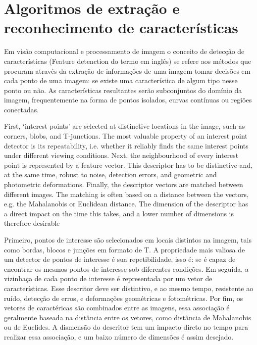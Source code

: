 \chapter{Algoritmos de extração e reconhecimento de características}

Em visão computacional e processamento de imagem o conceito de detecção de
características (Feature detenction do termo em inglês) se refere aos
métodos que procuram através da extração de informações de uma
imagem tomar decisões em cada ponto de uma imagem: se existe uma característica
de algum tipo nesse ponto ou não. As características resultantes serão
subconjuntos do domínio da imagem, frequentemente na forma de pontos isolados,
curvas contínuas ou regiões conectadas.

First, ‘interest points’ are selected at distinctive locations in the image,
such as corners, blobs, and T-junctions. The most valuable property of an
interest point detector is its repeatability, i.e. whether it reliably finds
the same interest points under different viewing conditions. Next, the
neighbourhood of every interest point is represented by a feature vector. This
descriptor has to be distinctive and, at the same time, robust to noise,
detection errors, and geometric and photometric deformations. Finally, the
descriptor vectors are matched between different images. The matching is often
based on a distance between the vectors, e.g. the Mahalanobis or Euclidean
distance. The dimension of the descriptor has a direct impact on the time this
takes, and a lower number of dimensions is therefore desirable

Primeiro, pontos de interesse são selecionados em locais distintos na imagem,
tais como bordas, blocos e junções em formato de T. A propriedade mais valiosa
de um detector de pontos de interesse é sua repetibilidade, isso é: se é capaz
de encontrar os mesmos pontos de interesse sob diferentes condições. Em
seguida, a vizinhaça de cada ponto de interesse é representada por um vetor de
características. Esse descritor deve ser distintivo, e ao mesmo tempo,
resistente ao ruído, detecção de erros, e deformações geométricas e
fotométricas. Por fim, os vetores de caractéricas são combinados entre as
imagens, essa associação é geralmente baseada na distância entre os vetores,
como distância de Mahalanobis ou de Euclides. A dismensão do descritor tem um
impacto direto no tempo para realizar essa associação, e um baixo número de
dimensões é assim desejado.

